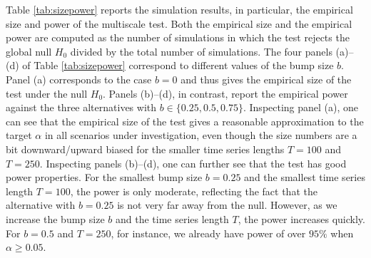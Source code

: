 \documentclass[12pt]{article}
\begin{document}
Table \ref{tab:sizepower} reports the simulation results, in particular, the empirical size and power of the multiscale test. Both the empirical size and the empirical power are computed as the number of simulations in which the test rejects the global null $H_0$ divided by the total number of simulations.
The four panels (a)--(d) of Table \ref{tab:sizepower} correspond to different values of the bump size $b$. Panel (a) corresponds to the case $b=0$ and thus gives the empirical size of the test under the null $H_0$. Panels (b)--(d), in contrast, report the empirical power against the three alternatives with $b \in \{0.25,0.5,0.75\}$.
Inspecting panel (a), one can see that the empirical size of the test gives a reasonable approximation to the target $\alpha$ in all scenarios under investigation, even though the size numbers are a bit downward/upward biased for the smaller time series lengths $T=100$ and $T=250$.
Inspecting panels (b)--(d), one can further see that the test has good power properties. For the smallest bump size $b = 0.25$ and the smallest time series length $T = 100$, the power is only moderate, reflecting the fact that the alternative with $b = 0.25$ is not very far away from the null. However, as we increase the bump size $b$ and the time series length $T$, the power increases quickly. For $b = 0.5$ and $T=250$, for instance, we already have power of over $95\%$ when $\alpha \ge 0.05$.
\end{document}
